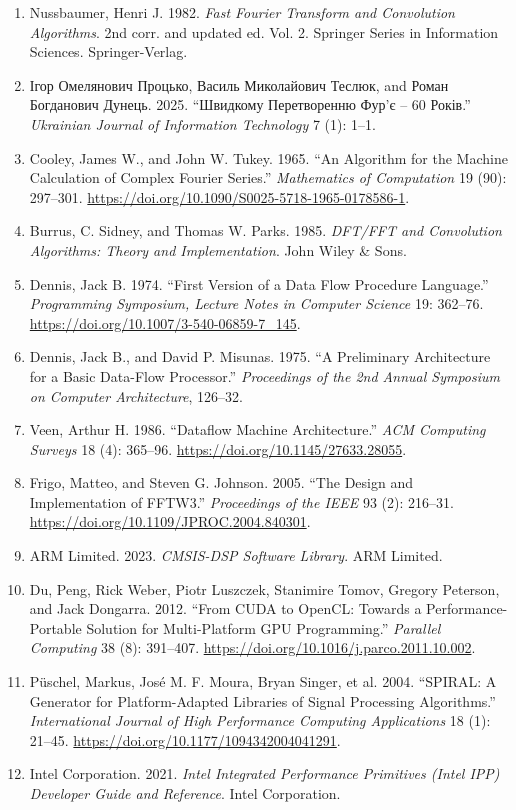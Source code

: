 \documentclass[
]{article}
\begin{document}
\begin{enumerate}
\def\labelenumi{\arabic{enumi}.}
\item
  Nussbaumer, Henri J. 1982. \emph{Fast Fourier Transform and
  Convolution Algorithms}. 2nd corr. and updated ed. Vol. 2. Springer
  Series in Information Sciences. Springer-Verlag.
\item
  Ігор Омелянович Процько, Василь Миколайович Теслюк, and Роман
  Богданович Дунець. 2025. ``Швидкому Перетворенню Фур'є -- 60 Років.''
  \emph{Ukrainian Journal of Information Technology} 7 (1): 1--1.
\item
  Cooley, James W., and John W. Tukey. 1965. ``An Algorithm for the
  Machine Calculation of Complex Fourier Series.'' \emph{Mathematics of
  Computation} 19 (90): 297--301.
  \url{https://doi.org/10.1090/S0025-5718-1965-0178586-1}.
\item
  Burrus, C. Sidney, and Thomas W. Parks. 1985. \emph{DFT/FFT and
  Convolution Algorithms: Theory and Implementation}. John Wiley \&
  Sons.
\item
  Dennis, Jack B. 1974. ``First Version of a Data Flow Procedure
  Language.'' \emph{Programming Symposium, Lecture Notes in Computer
  Science} 19: 362--76. \url{https://doi.org/10.1007/3-540-06859-7_145}.
\item
  Dennis, Jack B., and David P. Misunas. 1975. ``A Preliminary
  Architecture for a Basic Data-Flow Processor.'' \emph{Proceedings of
  the 2nd Annual Symposium on Computer Architecture}, 126--32.
\item
  Veen, Arthur H. 1986. ``Dataflow Machine Architecture.'' \emph{ACM
  Computing Surveys} 18 (4): 365--96.
  \url{https://doi.org/10.1145/27633.28055}.
\item
  Frigo, Matteo, and Steven G. Johnson. 2005. ``The Design and
  Implementation of FFTW3.'' \emph{Proceedings of the IEEE} 93 (2):
  216--31. \url{https://doi.org/10.1109/JPROC.2004.840301}.
\item
  ARM Limited. 2023. \emph{CMSIS-DSP Software Library}. ARM Limited.
\item
  Du, Peng, Rick Weber, Piotr Luszczek, Stanimire Tomov, Gregory
  Peterson, and Jack Dongarra. 2012. ``From CUDA to OpenCL: Towards a
  Performance-Portable Solution for Multi-Platform GPU Programming.''
  \emph{Parallel Computing} 38 (8): 391--407.
  \url{https://doi.org/10.1016/j.parco.2011.10.002}.
\item
  Püschel, Markus, José M. F. Moura, Bryan Singer, et al. 2004.
  ``SPIRAL: A Generator for Platform-Adapted Libraries of Signal
  Processing Algorithms.'' \emph{International Journal of High
  Performance Computing Applications} 18 (1): 21--45.
  \url{https://doi.org/10.1177/1094342004041291}.
\item
  Intel Corporation. 2021. \emph{Intel Integrated Performance Primitives
  (Intel IPP) Developer Guide and Reference}. Intel Corporation.
\end{enumerate}
\end{document}
